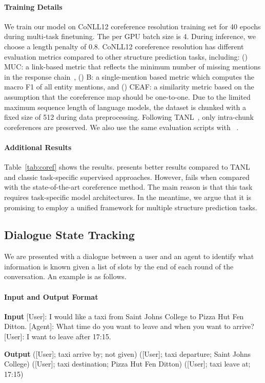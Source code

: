 \paragraph{Training Details} 
We train our model on CoNLL12 coreference resolution training set for 40 epochs during multi-task finetuning. The per GPU batch size is 4. During inference, we choose a length penalty of 0.8. CoNLL12 coreference resolution has different evaluation metrics compared to other structure prediction tasks, including: (\expandafter{}) MUC: a link-based metric that reflects the minimum number of missing mentions in the response chain~\cite{moosavi2016coreference}, (\expandafter{}) B: a single-mention based metric which computes the macro F1 of all entity mentions, and (\expandafter{}) CEAF: a similarity metric based on the assumption that the coreference map should be one-to-one.
Due to the limited maximum sequence length of language models, the dataset is chunked with a fixed size of 512 during data preprocessing. Following TANL~\cite{paolini2021structured}, only intra-chunk coreferences are preserved. We also use the same evaluation scripts with ~\cite{paolini2021structured}.

\paragraph{Additional Results}
Table~\ref{tab:coref} shows the results. \method presents better results compared to TANL and classic task-specific supervised approaches. However, \method fails when compared with the state-of-the-art coreference method. The main reason is that this task requires task-specific model architectures. In the meantime, we argue that it is promising to employ a unified framework for multiple structure prediction tasks.

\subsection{Dialogue State Tracking}
We are presented with a dialogue between a user and an agent to identify what information is known given a list of slots by the end of each round of the conversation. An example is as follows.

\paragraph{Input and Output Format}
\begin{enumerate*}
    \item[] {\bf Input} [User]: I would like a taxi from Saint Johns College to Pizza Hut Fen Ditton. [Agent]: What time do you want to leave and when you want to arrive? [User]: I want to leave after 17:15.
    \item[] {\bf Output} ([User]; taxi arrive by; not given) ([User]; taxi departure; Saint Johns College) ([User]; taxi destination; Pizza Hut Fen Ditton) ([User]; taxi leave at; 17:15)
\end{enumerate*}

